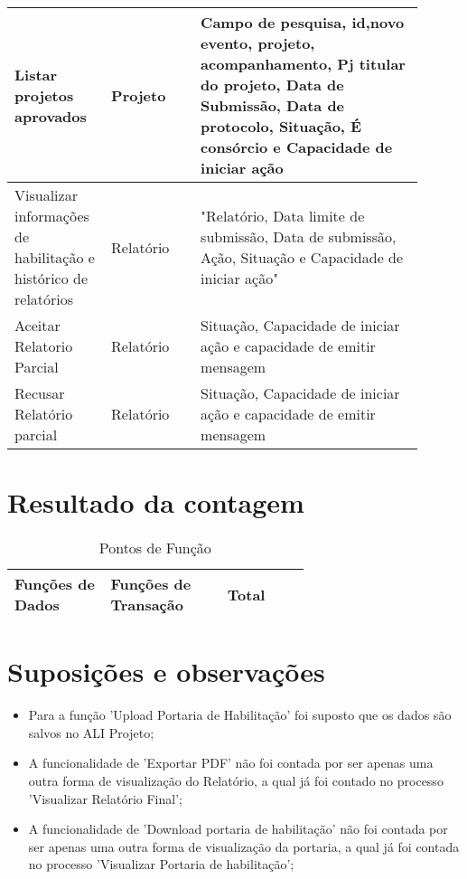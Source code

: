 \begin{longtable}{p{0.20\linewidth}p{0.20\linewidth}p{0.50\linewidth}}
    \hline
    Listar projetos aprovados&	Projeto&	Campo de pesquisa, id,novo evento,  projeto, acompanhamento, Pj titular do projeto, Data de Submissão, Data de protocolo, Situação, É consórcio e Capacidade de iniciar ação\\
    \hline
    Visualizar informações de habilitação e histórico de relatórios&	Relatório&	"Relatório, Data limite de submissão, Data de submissão, Ação, Situação e Capacidade de iniciar ação"\\

    \hline
    Aceitar Relatorio Parcial&	Relatório&	Situação, Capacidade de iniciar ação e capacidade de emitir mensagem\\

    \hline
    Recusar Relatório parcial&	Relatório&	Situação, Capacidade de iniciar ação e capacidade de emitir mensagem\\
    \hline
 \end{longtable}


\pagebreak
\section{Resultado da contagem}

\begin{table*}[!h]
\centering
\caption{Pontos de Função}
\label{Rotulo}
  \begin{tabular}{|p{0.20\linewidth}|p{0.25\linewidth}|p{0.20\linewidth}|}
  \hline
  \textbf{Funções de Dados} & \textbf{Funções de Transação} & \textbf{Total} \\ 
  \hline
 
  \end{tabular}
\end{table*}

\pagebreak
\section{Suposições e observações}

  \begin{itemize}
   \item Para a função 'Upload Portaria de Habilitação' foi suposto que os dados são salvos no ALI Projeto;
   \item A funcionalidade de 'Exportar PDF' não foi contada por ser apenas uma outra forma de visualização do Relatório, a qual já foi contado
   no processo 'Visualizar Relatório Final';
   \item A funcionalidade de 'Download portaria de habilitação' não foi contada por ser apenas uma outra forma de visualização da portaria, a qual
   já foi contada no processo 'Visualizar Portaria de habilitação';
  \end{itemize}

